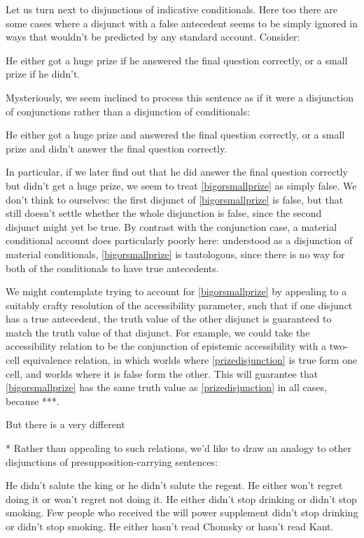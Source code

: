 \documentclass[If.tex]{subfiles}
\begin{document}
Let us turn next to disjunctions of indicative conditionals.  Here too there are some cases where a disjunct with a false antecedent seems to be simply ignored in ways that wouldn't be predicted by any standard account.  Consider:
\begin{prop}
	\nitem \label{bigorsmallprize}
	He either got a huge prize if he answered the final question correctly, or a small prize if he didn't.  
\end{prop}
Mysteriously, we seem inclined to process this sentence as if it were a disjunction of conjunctions rather than a disjunction of conditionals:
\begin{prop}
	\nitem \label{prizedisjunction}
	He either got a huge prize and answered the final question correctly, or a small prize and didn't answer the final question correctly.  
\end{prop}
In particular, if we later find out that he did answer the final question correctly but didn't get a huge prize, we seem to treat \ref{bigorsmallprize} as simply false.  We don't think to ourselves: the first disjunct of \ref{bigorsmallprize} is false, but that still doesn't settle whether the whole disjunction is false, since the second disjunct might yet be true.  By contrast with the conjunction case, a material conditional account does particularly poorly here: understood as a disjunction of material conditionals, \ref{bigorsmallprize} is tautologous, since there is no way for both of the conditionals to have true antecedents.

We might contemplate trying to account for \ref{bigorsmallprize} by appealing to a suitably crafty resolution of the accessibility parameter, such that if one disjunct has a true antecedent, the truth value of the other disjunct is guaranteed to match the truth value of that disjunct.  For example, we could take the accessibility relation to be the conjunction of epistemic accessibility with a two-cell equivalence relation, in which worlds where \ref{prizedisjunction} is true form one cell, and worlds where it is false form the other.  This will guarantee that \ref{bigorsmallprize} has the same truth value as \ref{prizedisjunction} in all cases, because ***.  

But there is a very different 


* Rather than appealing to such relations, we'd like to draw an analogy to other disjunctions of presupposition-carrying sentences:
\begin{prop}
	\nitem
	He didn't salute the king or he didn't salute the regent.
	\nitem
	He either won't regret doing it or won't regret not doing it.  
	\nitem
	He either didn't stop drinking or didn't stop smoking.  
	\nitem
	Few people who received the will power supplement didn't stop drinking or didn't stop smoking.
	\nitem
	He either hasn't read Chomsky or hasn't read Kant.
\end{prop}
\end{document}
